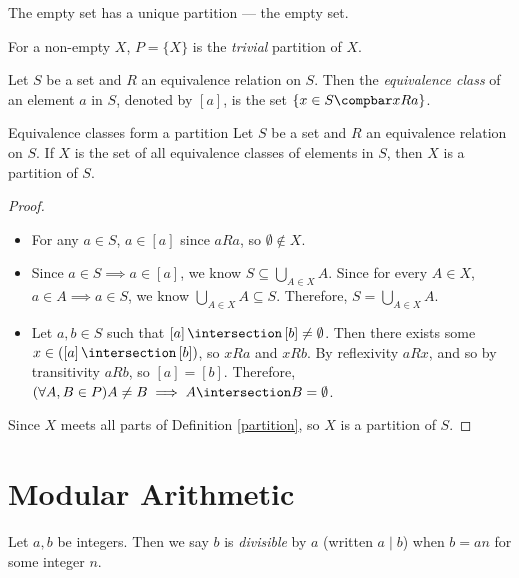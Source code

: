 \documentclass[12pt]{article}
\begin{document}
\begin{exmp}
    The empty set has a unique partition --- the empty set.
\end{exmp}

\begin{defn}
    For a non-empty $X$, $P = \{X\}$ is the \emph{trivial} partition of $X$.
\end{defn}

\begin{defn}\label{equivalence-class}
    Let $S$ be a set and $R$ an equivalence relation on $S$. Then the \emph{equivalence class} of an element $a$ in $S$, denoted by $\left[a\right]$, is the set $\left\{x \in S \compbar x R a\right\}$.
\end{defn}

\begin{thm}{Equivalence classes form a partition}\proofbreak
    Let $S$ be a set and $R$ an equivalence relation on $S$. If $X$ is the set of all equivalence classes of elements in $S$, then $X$ is a partition of $S$.
\end{thm}

\begin{proof}\proofbreak
    \begin{itemize}
        \item For any $a \in S$, $a \in \left[a\right]$ since $a R a$, so $\emptyset \notin X$.
        \item Since $a \in S \implies a \in \left[a\right]$, we know $S \subseteq \bigcup_{A\in X}A$. Since for every $A \in X$, $a \in A \implies a \in S$, we know $\bigcup_{A\in X}A \subseteq S$. Therefore, $S = \bigcup_{A\in X}A$.
        \item Let $a, b \in S$ such that $\left[a\right] \intersection \left[b\right] \neq \emptyset$. Then there exists some $x \in (\left[a\right] \intersection \left[b\right])$, so $x R a$ and $x R b$. By reflexivity $a R x$, and so by transitivity $a R b$, so $\left[a\right] = \left[b\right]$. Therefore, $(\forall A, B \in P) A \neq B \implies A \intersection B = \emptyset$.
    \end{itemize}
    Since $X$ meets all parts of Definition \ref{partition}, so $X$ is a partition of $S$.
\end{proof}

\section{Modular Arithmetic}

\begin{defn}\label{divisible}
    Let $a, b$ be integers. Then we say $b$ is \emph{divisible} by $a$ (written $a \mid b$) when $b = an$ for some integer $n$.
\end{defn}
\end{document}
